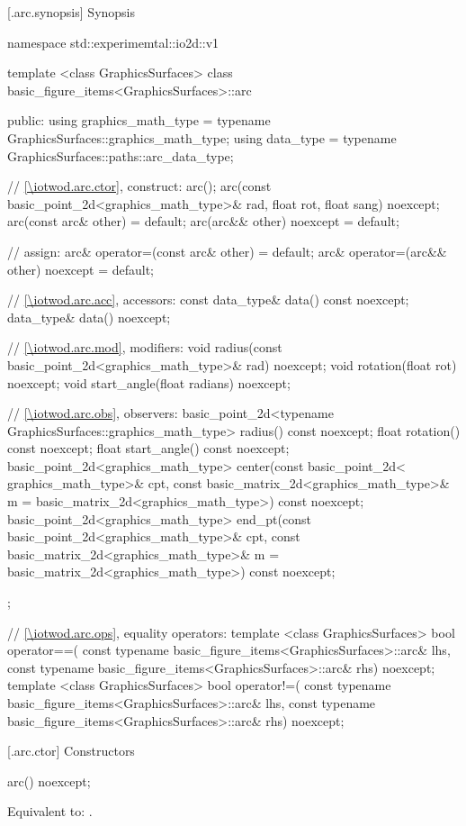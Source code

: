  [\iotwod.arc.synopsis] {Synopsis}
\begin{codeblock}
namespace std::experimemtal::io2d::v1 {
  template <class GraphicsSurfaces>
  class basic_figure_items<GraphicsSurfaces>::arc {
  public:
    using graphics_math_type = typename GraphicsSurfaces::graphics_math_type;
    using data_type =
      typename GraphicsSurfaces::paths::arc_data_type;

    // \ref{\iotwod.arc.ctor}, construct:
    arc();
    arc(const basic_point_2d<graphics_math_type>& rad, float rot, float sang) noexcept;
    arc(const arc& other) = default;
    arc(arc&& other) noexcept = default;

    // assign:
    arc& operator=(const arc& other) = default;
    arc& operator=(arc&& other) noexcept = default;

    // \ref{\iotwod.arc.acc}, accessors:
    const data_type& data() const noexcept;
    data_type& data() noexcept;

    // \ref{\iotwod.arc.mod}, modifiers:
    void radius(const basic_point_2d<graphics_math_type>& rad) noexcept;
    void rotation(float rot) noexcept;
    void start_angle(float radians) noexcept;

    // \ref{\iotwod.arc.obs}, observers:
    basic_point_2d<typename GraphicsSurfaces::graphics_math_type> radius() const noexcept;
    float rotation() const noexcept;
    float start_angle() const noexcept;
    basic_point_2d<graphics_math_type> center(const basic_point_2d< graphics_math_type>& cpt,
      const basic_matrix_2d<graphics_math_type>& m =
        basic_matrix_2d<graphics_math_type>{}) const noexcept;
    basic_point_2d<graphics_math_type> end_pt(const basic_point_2d<graphics_math_type>& cpt,
      const basic_matrix_2d<graphics_math_type>& m =
        basic_matrix_2d<graphics_math_type>{}) const noexcept;
  };

  // \ref{\iotwod.arc.ops}, equality operators:
  template <class GraphicsSurfaces>
  bool operator==(
    const typename basic_figure_items<GraphicsSurfaces>::arc& lhs,
    const typename basic_figure_items<GraphicsSurfaces>::arc& rhs) 
    noexcept;  
  template <class GraphicsSurfaces>
  bool operator!=(
    const typename basic_figure_items<GraphicsSurfaces>::arc& lhs,
    const typename basic_figure_items<GraphicsSurfaces>::arc& rhs) 
    noexcept;  
}
\end{codeblock}

 [\iotwod.arc.ctor] {Constructors}%

%
\begin{itemdecl}
arc() noexcept;
\end{itemdecl}
\begin{itemdescr}
\pnum
\effects Equivalent to: .
\end{itemdescr}

